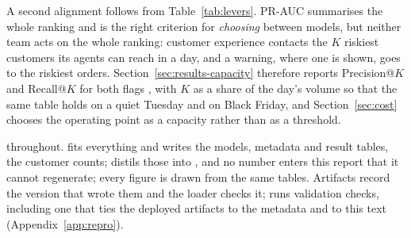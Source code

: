 A second alignment follows from Table~\ref{tab:levers}. PR-AUC summarises the
whole ranking and is the right criterion for \emph{choosing} between models,
but neither team acts on the whole ranking: customer experience contacts the
$K$ riskiest customers its agents can reach in a day, and a warning, where one
is shown, goes to the riskiest orders. Section~\ref{sec:results-capacity} therefore reports
Precision@$K$ and Recall@$K$ for both flags \citep{provost2013data,
verbeke2012churn}, with $K$ as a share of the day's volume so that the same
table holds on a quiet Tuesday and on Black Friday, and Section~\ref{sec:cost}
chooses the operating point as a capacity rather than as a threshold.

 throughout.  fits everything and
writes the models, metadata and result tables,  the
customer counts; 
distils those into , and no number enters this
report that it cannot regenerate; every figure is drawn from the same tables.
Artifacts record the  version that wrote them and the loader
checks it;  runs \textbf{\checkcount{}} validation
checks, including one that ties the deployed artifacts to the metadata and to
this text (Appendix~\ref{app:repro}).
